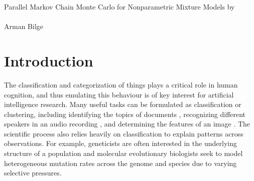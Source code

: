 \documentclass{uwstat572}
\begin{document}

\frenchspacing

\begin{center}
  {\Large Parallel Markov Chain Monte Carlo for Nonparametric Mixture Models by \citet*{WDX13}}\\\ \\
  {Arman Bilge}
\end{center}

\begin{abstract}
\end{abstract}

\section{Introduction}

The classification and categorization of things plays a critical role in human cognition, and thus emulating this behaviour is of key interest for artificial intelligence research.
Many useful tasks can be formulated as classification or clustering, including identifying the topics of documents \citep{ASW08}, recognizing different speakers in an audio recording \citep{Fox+08}, and determining the features of an image \citep{Sud+06}.
The scientific process also relies heavily on classification to explain patterns across observations.
For example, geneticists are often interested in the underlying structure of a population \citep{Teh+06,HA07,Ior+15} and molecular evolutionary biologists seek to model heterogeneous mutation rates across the genome \citep{Moo+14} and species \citep{HHH12} due to varying selective pressures.
\end{document}
